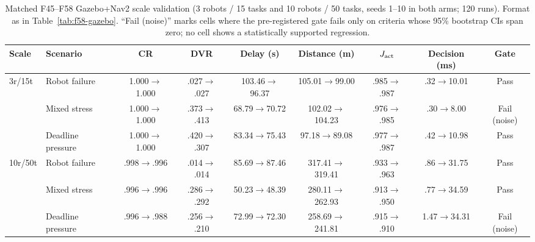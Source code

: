 \begin{table}[t]
\centering
\caption{Matched F45--F58 Gazebo+Nav2 scale validation (3 robots / 15
tasks and 10 robots / 50 tasks, seeds 1--10 in both arms; 120 runs).
Format as in Table~\ref{tab:f58-gazebo}. ``Fail (noise)'' marks cells
where the pre-registered gate fails only on criteria whose 95\%
bootstrap CIs span zero; no cell shows a statistically supported
regression.}
\label{tab:f58-gazebo-scales}
\small
\setlength{\tabcolsep}{3.4pt}
\begin{tabular}{llccccccc}
\toprule
Scale & Scenario & CR & DVR & Delay (s) & Distance (m) & $J_{\rm act}$ & Decision (ms) & Gate \\
\midrule
3r/15t & Robot failure
  & 1.000$\to$1.000 & .027$\to$.027 & 103.46$\to$96.37
  & 105.01$\to$99.00 & .985$\to$.987 & .32$\to$10.01 & Pass \\
& Mixed stress
  & 1.000$\to$1.000 & .373$\to$.413 & 68.79$\to$70.72
  & 102.02$\to$104.23 & .976$\to$.985 & .30$\to$8.00 & Fail (noise) \\
& Deadline pressure
  & 1.000$\to$1.000 & .420$\to$.307 & 83.34$\to$75.43
  & 97.18$\to$89.08 & .977$\to$.987 & .42$\to$10.98 & Pass \\
\midrule
10r/50t & Robot failure
  & .998$\to$.996 & .014$\to$.014 & 85.69$\to$87.46
  & 317.41$\to$319.41 & .933$\to$.963 & .86$\to$31.75 & Pass \\
& Mixed stress
  & .996$\to$.996 & .286$\to$.292 & 50.23$\to$48.39
  & 280.11$\to$262.93 & .913$\to$.950 & .77$\to$34.59 & Pass \\
& Deadline pressure
  & .996$\to$.988 & .256$\to$.210 & 72.99$\to$72.30
  & 258.69$\to$241.81 & .915$\to$.910 & 1.47$\to$34.31 & Fail (noise) \\
\bottomrule
\end{tabular}
\end{table}
